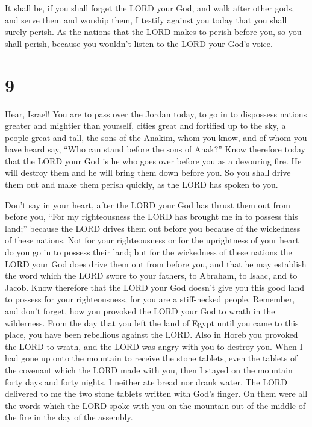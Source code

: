  It shall be, if you shall forget the LORD your God, and
walk after other gods, and serve them and worship them, I testify
against you today that you shall surely perish.  As the
nations that the LORD makes to perish before you, so you shall perish,
because you wouldn't listen to the LORD your God's voice.

\hypertarget{section-8}{%
\section{9}\label{section-8}}

 Hear, Israel! You are to pass over the Jordan today, to go
in to dispossess nations greater and mightier than yourself, cities
great and fortified up to the sky,  a people great and tall,
the sons of the Anakim, whom you know, and of whom you have heard say,
``Who can stand before the sons of Anak?''  Know therefore
today that the LORD your God is he who goes over before you as a
devouring fire. He will destroy them and he will bring them down before
you. So you shall drive them out and make them perish quickly, as the
LORD has spoken to you.

 Don't say in your heart, after the LORD your God has thrust
them out from before you, ``For my righteousness the LORD has brought me
in to possess this land;'' because the LORD drives them out before you
because of the wickedness of these nations.  Not for your
righteousness or for the uprightness of your heart do you go in to
possess their land; but for the wickedness of these nations the LORD
your God does drive them out from before you, and that he may establish
the word which the LORD swore to your fathers, to Abraham, to Isaac, and
to Jacob.  Know therefore that the LORD your God doesn't
give you this good land to possess for your righteousness, for you are a
stiff-necked people.  Remember, and don't forget, how you
provoked the LORD your God to wrath in the wilderness. From the day that
you left the land of Egypt until you came to this place, you have been
rebellious against the LORD.  Also in Horeb you provoked the
LORD to wrath, and the LORD was angry with you to destroy you.
 When I had gone up onto the mountain to receive the stone
tablets, even the tablets of the covenant which the LORD made with you,
then I stayed on the mountain forty days and forty nights. I neither ate
bread nor drank water.  The LORD delivered to me the two
stone tablets written with God's finger. On them were all the words
which the LORD spoke with you on the mountain out of the middle of the
fire in the day of the assembly.

